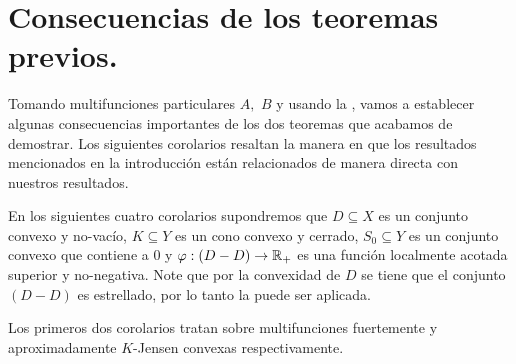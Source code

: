 \section{Consecuencias de los teoremas previos.}

Tomando multifunciones particulares $A,$ $B$ y usando la , vamos a establecer algunas
consecuencias importantes de los dos teoremas que acabamos de demostrar. Los siguientes 
corolarios resaltan la manera en que los resultados mencionados en la introducción están relacionados
de manera directa con nuestros resultados.

En los siguientes cuatro corolarios supondremos que $D\subseteq X$ es un conjunto convexo y no-vacío,
$K\subseteq Y$ es un cono convexo y cerrado, $S_0\subseteq Y$ es un conjunto convexo que contiene a 
$0$ y $\varphi:(D-D)\to\mathbb{R}_+$ es una función localmente acotada superior y no-negativa. 
Note que por la convexidad de $D$ se tiene que el conjunto 
$(D-D)$ es estrellado, por lo tanto la  puede ser aplicada. 

Los primeros dos corolarios tratan sobre multifunciones fuertemente y aproximadamente
$K$-Jensen convexas respectivamente.

